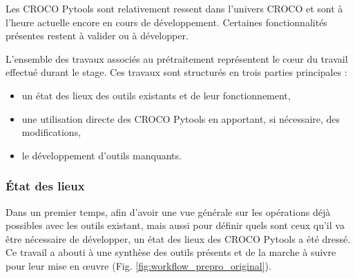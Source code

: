 \documentclass[10pt,a4paper,titlepage]{article}
\begin{document}
Les CROCO Pytools sont relativement ressent dans l'univers CROCO et sont à l'heure actuelle encore en cours de développement. %
Certaines fonctionnalités présentes restent à valider ou à développer.



L'ensemble des travaux associés au prétraitement représentent le c\oe{}ur du travail effectué durant le stage.
Ces travaux sont structurés en trois parties principales :
\begin{itemize}
    \item un état des lieux des outils existants et de leur fonctionnement,
    \item une utilisation directe des CROCO Pytools en apportant, si nécessaire, des modifications,
    \item le développement d'outils manquants.
\end{itemize}

\subsubsection{État des lieux}
\label{subsub:etat_des_lieux}

Dans un premier temps, afin d'avoir une vue générale sur les opérations déjà possibles avec les outils existant, mais aussi pour définir quels sont ceux qu'il va être nécessaire de développer, un état des lieux des CROCO Pytools a été dressé.
Ce travail a abouti à une synthèse des outils présents et de la marche à suivre pour leur mise en \oe{}uvre (Fig. \ref{fig:workflow_prepro_original}).
\end{document}
